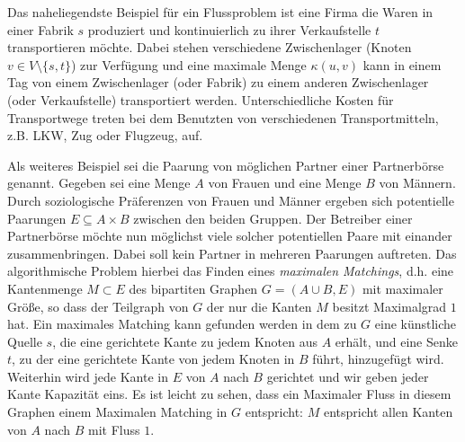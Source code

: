 Das naheliegendste Beispiel f\"ur ein Flussproblem ist eine 
Firma die Waren in einer Fabrik $s$ produziert und 
kontinuierlich zu ihrer Verkaufstelle $t$ transportieren m\"ochte. 
Dabei stehen verschiedene Zwischenlager 
(Knoten $v \in V \setminus \{s,t\}$)  zur Verf\"ugung und eine 
maximale Menge $\kappa(u,v)$ kann in einem Tag von einem 
Zwischenlager (oder Fabrik) zu einem anderen Zwischenlager 
(oder Verkaufstelle) transportiert werden. Unterschiedliche Kosten
f\"ur Transportwege treten bei dem Benutzten von verschiedenen 
Transportmitteln, z.B. LKW, Zug oder Flugzeug, auf. 

Als weiteres Beispiel sei die Paarung von m\"oglichen Partner 
einer Partnerb\"orse genannt. Gegeben sei eine Menge $A$ von 
Frauen und eine Menge $B$ von M\"annern. 
Durch soziologische Pr\"aferenzen von Frauen und  M\"anner 
ergeben sich potentielle Paarungen $E \subseteq A \times B$
zwischen den beiden Gruppen. Der Betreiber einer Partnerb\"orse 
m\"ochte nun m\"oglichst viele
solcher potentiellen Paare mit einander zusammenbringen.
Dabei soll kein Partner in mehreren Paarungen auftreten. 
Das algorithmische Problem hierbei das Finden eines 
\emph{maximalen Matchings}, d.h. eine Kantenmenge 
$M \subset E$ des bipartiten Graphen $G = (A \cup B, E)$ mit 
maximaler Gr\"o\ss e, so dass der Teilgraph von $G$ der nur 
die Kanten $M$ besitzt Maximalgrad $1$ hat. Ein maximales Matching
kann gefunden werden in dem zu $G$ eine k\"unstliche Quelle $s$, 
die eine gerichtete Kante zu jedem Knoten aus $A$ erh\"alt, 
und eine Senke $t$, zu der eine gerichtete Kante von jedem 
Knoten in $B$ f\"uhrt, hinzugef\"ugt wird. Weiterhin wird jede
Kante in $E$ von $A$ nach $B$ gerichtet und wir geben jeder 
Kante Kapazit\"at eins. Es ist leicht zu sehen, 
dass ein Maximaler Fluss in diesem Graphen einem Maximalen 
Matching in $G$ entspricht: $M$ entspricht allen Kanten von $A$
nach $B$ mit Fluss $1$. \cite{schoening, algo}


